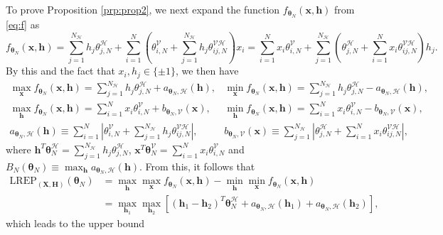 \documentclass[numbib]{imamat}
\theoremstyle{theorem}
\theoremstyle{lemma}
\theoremstyle{example}
\theoremstyle{corollary}
\theoremstyle{definition}
\theoremstyle{remark}
\theoremstyle{approximation}
\theoremstyle{scheme}
\newcommand{\REP}{\mathrm{LREP}}
\newcommand{\Gam}{B_{N}(\boldsymbol \theta_N) }
\begin{document}
To prove Proposition \ref{prp:prop2}, we next expand the function
\(f_{\boldsymbol \theta_N} (\boldsymbol x, \boldsymbol h)\) from
\eqref{eq:f} as \[
f_{\boldsymbol \theta_N} (\boldsymbol x, \boldsymbol h)= \sum_{j=1}^{N_\mathcal{H}} h_j \theta_{j,N}^{\mathcal{H}}  +   \sum_{i=1}^N \left( \theta_{i,N}^{\mathcal{V}} + \sum_{j=1}^{N_\mathcal{H}}  h_j  \theta_{ij,N}^{\mathcal{VH}}\right)x_i=\sum_{i=1}^N x_i  \theta_{i,N}^{\mathcal{V}} +  \sum_{j=1}^{N_\mathcal{H}} \left( \theta_{j,N}^{\mathcal{H}}  + \sum_{i=1}^N  x_i  \theta_{ij,N}^{\mathcal{VH}}\right)h_j.
\] By this and the fact that \(x_i,h_j\in\{\pm 1\}\), we then have
\begin{align}
\nonumber \max_{\boldsymbol x}  f_{\boldsymbol \theta_N} (\boldsymbol x, \boldsymbol h) =  \sum_{j=1}^{N_\mathcal{H}} h_j \theta_{j,N}^{\mathcal{H}}  +   a_{\boldsymbol \theta_N, \mathcal{H}} (\boldsymbol h), & \min_{\boldsymbol x}  f_{\boldsymbol \theta_N} (\boldsymbol x, \boldsymbol h) =  \sum_{j=1}^{N_\mathcal{H}} h_j \theta_{j,N}^{\mathcal{H}}  - a_{\boldsymbol \theta_N, \mathcal{H}} (\boldsymbol h),\\
\nonumber \max_{\boldsymbol h}  f_{\boldsymbol \theta_N} (\boldsymbol x, \boldsymbol h) = \sum_{i=1}^{N}x_i \theta_{i,N}^{\mathcal{V}} + b_{\boldsymbol \theta_N, \mathcal{V}} (\boldsymbol x), & \min_{\boldsymbol h}  f_{\boldsymbol \theta_N} (\boldsymbol x, \boldsymbol h) = \sum_{i=1}^{N}x_i \theta_{i,N}^{\mathcal{V}}  -   b_{\boldsymbol \theta_N, \mathcal{V}} (\boldsymbol x), \\ 
\label{eq:max}
a_{\boldsymbol \theta_N, \mathcal{H}} (\boldsymbol h) \equiv \sum_{i=1}^N \left| \theta_{i,N}^{\mathcal{V}} + \sum_{j=1}^{N_\mathcal{H}}  h_j  \theta_{ij,N}^{\mathcal{VH}}\right|, &  b_{\boldsymbol \theta_N, \mathcal{V}} (\boldsymbol x) \equiv \sum_{j=1}^{N_\mathcal{H}} \left| \theta_{j,N}^{\mathcal{H}}  + \sum_{i=1}^N  x_i  \theta_{ij,N}^{\mathcal{VH}}\right|,
\end{align} where
\(\boldsymbol h^T \boldsymbol \theta_N^{\mathcal{H}}=\sum_{j=1}^{N_\mathcal{H}} h_j \theta_{j,N}^{\mathcal{H}}\),
\(\boldsymbol x^T \boldsymbol \theta_N^{\mathcal{V}}= \sum_{i=1}^{N}x_i \theta_{i,N}^{\mathcal{V}}\)
and
\(\Gam\equiv \max_{\boldsymbol h} a_{\boldsymbol \theta_N, \mathcal{H}} (\boldsymbol h)\).
From this, it follows that \begin{align*}
\REP_{(\boldsymbol X, \boldsymbol H)}(\boldsymbol \theta_N) &=  \max_{\boldsymbol h}\max_{\boldsymbol x}f_{\boldsymbol \theta_N} (\boldsymbol x , \boldsymbol h) -  \min_{\boldsymbol h}\min_{\boldsymbol x}f_{\boldsymbol \theta_N} (\boldsymbol x , \boldsymbol h)\\
&= \max_{\boldsymbol h_1 }  \max_{\boldsymbol h_2 }\left[ (\boldsymbol h_1 - \boldsymbol h_2)^T \boldsymbol \theta_N^{\mathcal{H}}  +   a_{\boldsymbol \theta_N, \mathcal{H}} (\boldsymbol h_1)  + a_{\boldsymbol \theta_N, \mathcal{H}} (\boldsymbol h_2)\right],
\end{align*} which leads to the upper bound
\end{document}
